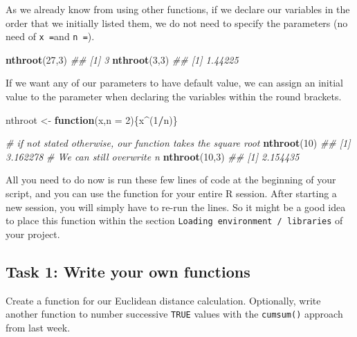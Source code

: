 \documentclass[]{book}
\newenvironment{Shaded}{\begin{snugshade}}{\end{snugshade}}
\newcommand{\CommentTok}[1]{\textcolor[rgb]{0.56,0.35,0.01}{\textit{#1}}}
\newcommand{\ControlFlowTok}[1]{\textcolor[rgb]{0.13,0.29,0.53}{\textbf{#1}}}
\newcommand{\DataTypeTok}[1]{\textcolor[rgb]{0.13,0.29,0.53}{#1}}
\newcommand{\DecValTok}[1]{\textcolor[rgb]{0.00,0.00,0.81}{#1}}
\newcommand{\KeywordTok}[1]{\textcolor[rgb]{0.13,0.29,0.53}{\textbf{#1}}}
\newcommand{\NormalTok}[1]{#1}
\newcommand{\OperatorTok}[1]{\textcolor[rgb]{0.81,0.36,0.00}{\textbf{#1}}}
\newcommand{\StringTok}[1]{\textcolor[rgb]{0.31,0.60,0.02}{#1}}
\begin{document}
As we already know from using other functions, if we declare our variables in the order that we initially listed them, we do not need to specify the parameters (no need of \texttt{x\ =}and \texttt{n\ =}).

\begin{Shaded}
\begin{Highlighting}[]
\KeywordTok{nthroot}\NormalTok{(}\DecValTok{27}\NormalTok{,}\DecValTok{3}\NormalTok{)}
\CommentTok{## [1] 3}
\KeywordTok{nthroot}\NormalTok{(}\DecValTok{3}\NormalTok{,}\DecValTok{3}\NormalTok{)}
\CommentTok{## [1] 1.44225}
\end{Highlighting}
\end{Shaded}

If we want any of our parameters to have default value, we can assign an initial value to the parameter when declaring the variables within the round brackets.

\begin{Shaded}
\begin{Highlighting}[]
\NormalTok{nthroot <-}\StringTok{ }\ControlFlowTok{function}\NormalTok{(x,}\DataTypeTok{n =} \DecValTok{2}\NormalTok{)\{x}\OperatorTok{^}\NormalTok{(}\DecValTok{1}\OperatorTok{/}\NormalTok{n)\}}

\CommentTok{# if not stated otherwise, our function takes the square root}
\KeywordTok{nthroot}\NormalTok{(}\DecValTok{10}\NormalTok{)}
\CommentTok{## [1] 3.162278}
\CommentTok{# We can still overwrite n}
\KeywordTok{nthroot}\NormalTok{(}\DecValTok{10}\NormalTok{,}\DecValTok{3}\NormalTok{)}
\CommentTok{## [1] 2.154435}
\end{Highlighting}
\end{Shaded}

All you need to do now is run these few lines of code at the beginning of your script, and you can use the function for your entire R session. After starting a new session, you will simply have to re-run the lines. So it might be a good idea to place this function within the section \texttt{Loading\ environment\ /\ libraries} of your project.

\hypertarget{task-1-write-your-own-functions}{%
\subsection{Task 1: Write your own functions}\label{task-1-write-your-own-functions}}

Create a function for our Euclidean distance calculation. Optionally, write another function to number successive \texttt{TRUE} values with the \texttt{cumsum()} approach from last week.
\end{document}
